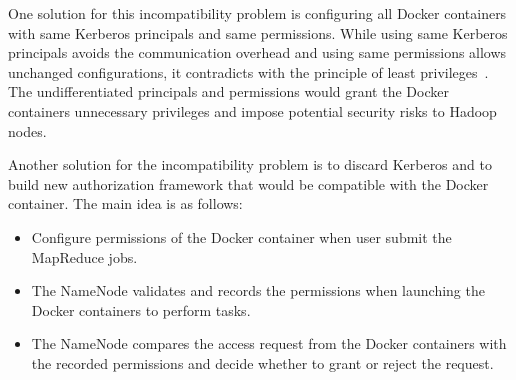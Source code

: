 One solution for this incompatibility problem is configuring all Docker containers with same Kerberos principals and same permissions. While using same Kerberos principals avoids the communication overhead and using same permissions allows unchanged configurations, it contradicts with the principle of least privileges~\cite{least}. The undifferentiated principals and permissions would grant the Docker containers unnecessary privileges and impose potential security risks to Hadoop nodes.

Another solution for the incompatibility problem is to discard Kerberos and to build new authorization framework that would be compatible with the Docker container. The main idea is as follows:
\begin{itemize}
\item {Configure permissions of the Docker container when user submit the MapReduce jobs.}
\item {The NameNode validates and records the permissions when launching the Docker containers to perform tasks.}
\item {The NameNode compares the access request from the Docker containers with the recorded permissions and decide whether to grant or reject the request.}
\end{itemize}
